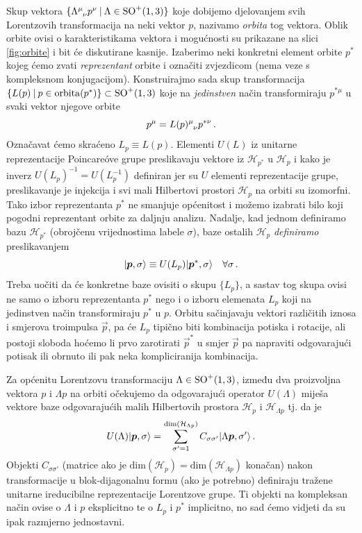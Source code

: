 Skup vektora $\{ \tensor{\Lambda}{^\mu_\nu}p^{\nu} \: | \: \Lambda \in \SOsup{+}{1,3}\}$
koje dobijemo djelovanjem svih Lorentzovih transformacija na neki
vektor $p$, nazivamo \emph{orbita} tog vektora. Oblik orbite ovisi o karakteristikama
vektora i mogućnosti su prikazane na slici \ref{fig:orbite} i bit će diskutirane kasnije.
Izaberimo neki konkretni element orbite $p^{*}$ kojeg ćemo zvati
\emph{reprezentant} orbite i označiti zvjezdicom (nema veze s kompleksnom konjugacijom).
Konstruirajmo sada skup transformacija 
$\{L(p) \: | \: p \in \mathrm{orbita}(p^*) \} \subset \mathrm{SO}^{+}(1,3)$ koje
na \emph{jedinstven} način transformiraju $p^{*\mu}$ u svaki vektor njegove orbite
\begin{equation}
p^{\mu} = \tensor{L(p)}{^\mu_\nu} p^{*\nu}\,.
\end{equation}
Označavat ćemo skraćeno $L_{p} \equiv L(p)$.
Elementi $U(L)$ iz unitarne reprezentacije Poincare\'{o}ve grupe
preslikavaju vektore iz $\mathcal{H}_{p^*}$ u $\mathcal{H}_{p}$
i kako je inverz $U(L_{p})^{-1} = U(L_{p}^{-1})$ definiran jer
su $U$ elementi reprezentacije grupe, preslikavanje je injekcija i
svi mali Hilbertovi prostori $\mathcal{H}_{p}$ na orbiti su 
izomorfni. Tako izbor reprezentanta $p^*$ ne smanjuje općenitost
i možemo izabrati bilo koji pogodni reprezentant orbite za daljnju
analizu. Nadalje, kad jednom definiramo bazu  $\mathcal{H}_{p^*}$
(obrojčenu vrijednostima labele $\sigma$), baze ostalih $\mathcal{H}_{p}$
\emph{definiramo} preslikavanjem
\begin{equation}
\ket{\vec{p}, \sigma} \equiv U(L_{p}) \ket{\vec{p}^*, \sigma} \quad \forall \sigma \,.
    \label{eq:defbazaHp}
\end{equation}
Treba uočiti da će konkretne baze ovisiti o skupu $\{L_{p}\}$, a
sastav tog skupa ovisi ne samo o izboru reprezentanta $p^*$ nego i
o izboru elemenata $L_p$ koji na jedinstven način transformiraju
$p^*$ u $p$. Orbitu sačinjavaju vektori različitih iznosa i smjerova
troimpulsa $\vec{p}$,
pa će $L_p$ tipično biti kombinacija potiska i rotacije, ali postoji
sloboda hoćemo li prvo zarotirati $\vec{p}^*$ u smjer $\vec{p}$ pa 
napraviti odgovarajući potisak ili obrnuto ili pak neka kompliciranija kombinacija.

Za općenitu Lorentzovu transformaciju $\Lambda \in \mathrm{SO}^{+}(1,3)$,
između dva proizvoljna vektora $p$ i $\Lambda p$ na orbiti očekujemo 
da odgovarajući operator $U(\Lambda)$ miješa vektore baze
odgovarajućih malih Hilbertovih prostora $\mathcal{H}_{p}$
i $\mathcal{H}_{\Lambda p}$ tj. da je
\begin{equation}
    U(\Lambda) \ket{\vec{p}, \sigma} = \sum_{\sigma'=1}^{\mathrm{dim}(\mathcal{H}_{\Lambda p})}
    C_{\sigma \sigma'} \ket{\Lambda\vec{p}, \sigma'} \,.
\end{equation}
Objekti $C_{\sigma \sigma'}$ (matrice ako je $\mathrm{dim}(\mathcal{H}_{p}) =
\mathrm{dim}(\mathcal{H}_{\Lambda p})$ konačan)
nakon transformacije u blok-dijagonalnu
formu (ako je potrebno) definiraju tražene unitarne ireducibilne reprezentacije
Lorentzove grupe. Ti objekti na kompleksan način ovise o $\Lambda$ i
$p$ eksplicitno te o $L_{p}$ i $p^*$ implicitno,
no sad ćemo vidjeti da su ipak razmjerno jednostavni.

